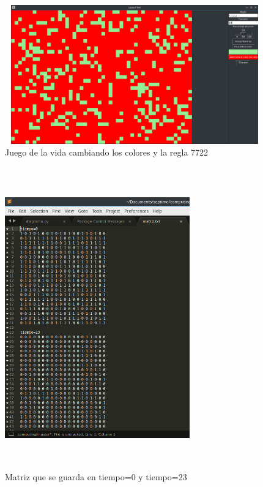 \begin{figure}[H]
\begin{center}
 \includegraphics[width=13cm, height=6cm]{./img/gol_colores.png}
 \caption{Juego de la vida cambiando los colores y la regla 7722}
 \label{fig:gol_colores}
\end{center}
\end{figure}

\begin{figure}[H]
\begin{center}
 \includegraphics[width=8cm, height=13cm]{./img/matriz.png}
 \caption{Matriz que se guarda en tiempo=0 y tiempo=23}
 \label{fig:matriz}
\end{center}
\end{figure}

